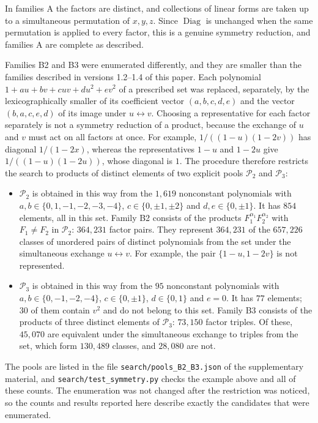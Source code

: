 \documentclass[11pt]{amsart}
\theoremstyle{definition}
\theoremstyle{remark}
\numberwithin{equation}{section}
\DeclareMathOperator{\Diag}{Diag}
\begin{document}
In families A the factors are distinct, and collections of linear forms are taken up to a simultaneous permutation of $x,y,z$. Since $\Diag$ is unchanged when the same permutation is applied to every factor, this is a genuine symmetry reduction, and families A are complete as described.

Families B2 and B3 were enumerated differently, and they are smaller than the families described in versions 1.2--1.4 of this paper. Each polynomial $1+au+bv+cuv+du^2+ev^2$ of a prescribed set was replaced, separately, by the lexicographically smaller of its coefficient vector $(a,b,c,d,e)$ and the vector $(b,a,c,e,d)$ of its image under $u\leftrightarrow v$. Choosing a representative for each factor separately is not a symmetry reduction of a product, because the exchange of $u$ and $v$ must act on all factors at once. For example, $1/((1-u)(1-2v))$ has diagonal $1/(1-2x)$, whereas the representatives $1-u$ and $1-2u$ give $1/((1-u)(1-2u))$, whose diagonal is $1$. The procedure therefore restricts the search to products of distinct elements of two explicit pools $\mathcal P_2$ and $\mathcal P_3$:
\begin{itemize}[leftmargin=2em]
\item $\mathcal P_2$ is obtained in this way from the $1{,}619$ nonconstant polynomials with $a,b\in\{0,1,-1,-2,-3,-4\}$, $c\in\{0,\pm1,\pm2\}$ and $d,e\in\{0,\pm1\}$. It has $854$ elements, all in this set. Family B2 consists of the products $F_1^{\alpha_1}F_2^{\alpha_2}$ with $F_1\ne F_2$ in $\mathcal P_2$: $364{,}231$ factor pairs. They represent $364{,}231$ of the $657{,}226$ classes of unordered pairs of distinct polynomials from the set under the simultaneous exchange $u\leftrightarrow v$. For example, the pair $\{1-u,1-2v\}$ is not represented.
\item $\mathcal P_3$ is obtained in this way from the $95$ nonconstant polynomials with $a,b\in\{0,-1,-2,-4\}$, $c\in\{0,\pm1\}$, $d\in\{0,1\}$ and $e=0$. It has $77$ elements; $30$ of them contain $v^2$ and do not belong to this set. Family B3 consists of the products of three distinct elements of $\mathcal P_3$: $73{,}150$ factor triples. Of these, $45{,}070$ are equivalent under the simultaneous exchange to triples from the set, which form $130{,}489$ classes, and $28{,}080$ are not.
\end{itemize}
The pools are listed in the file \texttt{search/pools\_B2\_B3.json} of the supplementary material, and \texttt{search/test\_symmetry.py} checks the example above and all of these counts. The enumeration was not changed after the restriction was noticed, so the counts and results reported here describe exactly the candidates that were enumerated.
\end{document}
